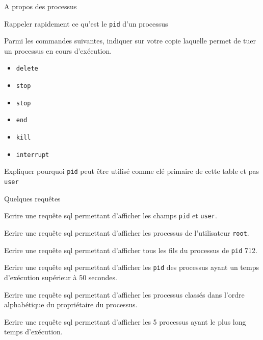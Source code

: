 \documentclass[11pt,a4paper]{article}
\begin{document}
\QListe
\item A propos des processus
\SQListe
\item Rappeler rapidement ce qu'est le {\tt pid} d'un processus
\item Parmi les commandes suivantes, indiquer sur votre copie laquelle permet de tuer un processus en cours d'exécution.
    \begin{itemize}
        \item {\tt delete}
        \item {\tt stop}
        \item {\tt stop}
        \item {\tt end}
        \item {\tt kill}
        \item {\tt interrupt}
    \end{itemize}
\item Expliquer pourquoi {\tt pid} peut être utilisé comme clé primaire de cette table et pas {\tt user}
\FinListe
\item Quelques requêtes
\SQListe
\item Ecrire une requête {\sc sql} permettant d'afficher les champs {\tt pid} et {\tt user}.
\item Ecrire une requête {\sc sql} permettant d'afficher les processus de l'utilisateur {\tt root}.
\item Ecrire une requête {\sc sql} permettant d'afficher tous les fils du processus de {\tt pid} 712.
\item Ecrire une requête {\sc sql} permettant d'afficher les {\tt pid} des processus ayant un temps d'exécution supérieur à 50 secondes.
\item Ecrire une requête {\sc sql} permettant d'afficher les processus classés dans l'ordre alphabétique du propriétaire du processus.
\item \item Ecrire une requête {\sc sql} permettant d'afficher les 5 processus ayant le plus long temps d'exécution.
\FinListe
\FinListe

\separateur
\end{document}

